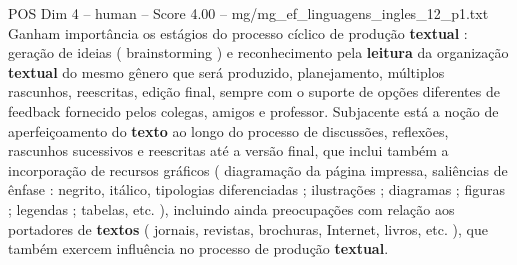 \begin{textsample}{POS Dim 4 – human – Score 4.00 – mg/mg\_ef\_linguagens\_ingles\_12\_p1.txt}  \label{ex:f4_pos_015}
Ganham importância os estágios do processo cíclico de produção \textbf{textual} : geração de ideias ( brainstorming ) e reconhecimento pela \textbf{leitura} da organização \textbf{textual} do mesmo gênero que será produzido, planejamento, múltiplos rascunhos, reescritas, edição final, sempre com o suporte de opções diferentes de feedback fornecido pelos colegas, amigos e professor.
Subjacente está a noção de aperfeiçoamento do \textbf{texto} ao longo do processo de discussões, reflexões, rascunhos sucessivos e reescritas até a versão final, que inclui também a incorporação de recursos gráficos ( diagramação da página impressa, saliências de ênfase : negrito, itálico, tipologias diferenciadas ; ilustrações ; diagramas ; figuras ; legendas ; tabelas, etc. ), incluindo ainda preocupações com relação aos portadores de \textbf{textos} ( jornais, revistas, brochuras, Internet, livros, etc. ), que também exercem influência no processo de produção \textbf{textual}.

\end{textsample}
